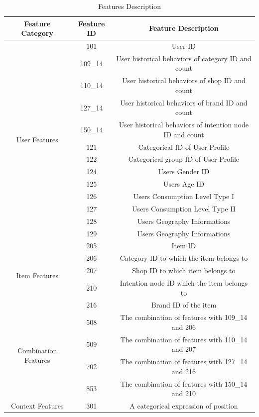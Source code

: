 \begin{table}[H]
    \centering
    \begin{tabular}{|c|c|c|}
        \hline
        \textbf{Feature Category} & \textbf{Feature ID} & \textbf{Feature Description} \\
        \hline
        \multirow{13}{*}{User Features} & 101 & User ID \\
        \cline{2-3}
        & 109\_14 & User historical behaviors of category ID and count \\
        \cline{2-3}
        & 110\_14 & User historical behaviors of shop ID and count \\
        \cline{2-3}
        & 127\_14 & User historical behaviors of brand ID and count \\
        \cline{2-3}
        & 150\_14 & User historical behaviors of intention node ID and count \\
        \cline{2-3}
        & 121 & Categorical ID of User Profile \\
        \cline{2-3}
        & 122 & Categorical group ID of User Profile \\
        \cline{2-3}
        & 124 & Users Gender ID \\
        \cline{2-3}
        & 125 & Users Age ID \\
        \cline{2-3}
        & 126 & Users Consumption Level Type I \\
        \cline{2-3}
        & 127 & Users Consumption Level Type II \\
        \cline{2-3}
        & 128 & Users Geography Informations \\
        \cline{2-3}
        & 129 & Users Geography Informations \\
        \hline
        \multirow{5}{*}{Item Features} & 205 & Item ID \\
        \cline{2-3}
        & 206 & Category ID to which the item belongs to \\
        \cline{2-3}
        & 207 & Shop ID to which item belongs to \\
        \cline{2-3}
        & 210 & Intention node ID which the item belongs to \\
        \cline{2-3}
        & 216 & Brand ID of the item \\
        \hline
        \multirow{4}{*}{Combination Features} & 508 & The combination of features with 109\_14 and 206 \\
        \cline{2-3}
        & 509 & The combination of features with 110\_14 and 207 \\
        \cline{2-3}
        & 702 & The combination of features with 127\_14 and 216 \\
        \cline{2-3}
        & 853 & The combination of features with 150\_14 and 210 \\
        \hline
        \multirow{1}{*}{Context Features} & 301 & A categorical expression of position \\
        \hline
    \end{tabular}
    \caption{Features Description}
    \label{tab:features}
\end{table}






